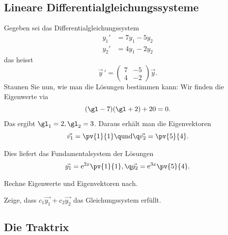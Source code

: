 \documentclass[%
draft,
11pt,%
twoside,%
titlepage,%
german,%
headsepline%
]{scrartcl}
\begin{document}
\subsection{Lineare Differentialgleichungssysteme}

\begin{bsp}
Gegeben sei das Differentialgleichungssystem
\begin{align*}
y_1'&=7y_1-5y_2\\
y_2'&=4y_1-2y_2
\end{align*}
das heisst
$$\vec{y}\,'=
\begin{pmatrix}
7 & -5\\
4 & -2
\end{pmatrix}
\vec{y}.$$
Staunen Sie nun, wie man die L\"osungen bestimmen kann:
Wir finden die Eigenwerte via
$$(\gl-7)(\gl+2)+20=0.$$
Das ergibt $\gl_1=2, \gl_2=3$. Daraus erh\"alt man die Eigenvektoren
$$\vec{v_1}=\pv{1}{1}\q\text{und}\q\vec{v_2}=\pv{5}{4}.$$

Dies liefert das Fundamentalsystem der L\"osungen
$$\vec{y_1}=\mathrm{e}^{2x}\pv{1}{1},\q\vec{y_2}=\mathrm{e}^{3x}\pv{5}{4}.$$
\end{bsp}

\begin{ueb}
Rechne Eigenwerte und Eigenvektoren nach.
\end{ueb}


\begin{ueb}
Zeige, dass $c_1\vec{y_1}+c_2\vec{y_2}$ das Gleichungssystem erfüllt.
\end{ueb}

\subsection{Die Traktrix}
\end{document}
